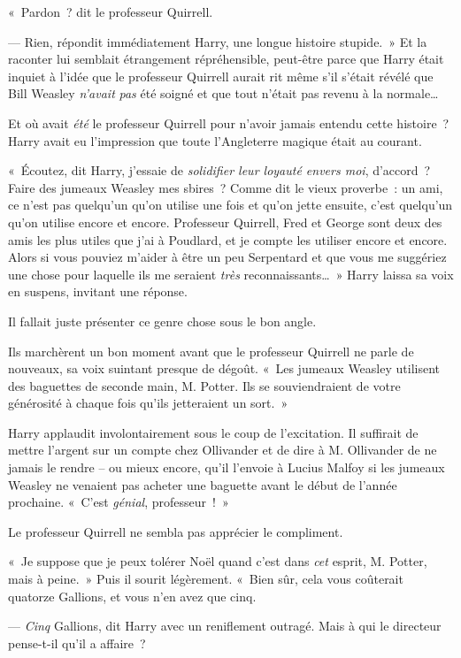 «~Pardon~? dit le professeur Quirrell.

--- Rien, répondit immédiatement Harry, une longue histoire stupide.~»
Et la raconter lui semblait étrangement répréhensible, peut-être parce que Harry était inquiet à l'idée que le professeur Quirrell aurait rit même s'il s'était révélé que Bill Weasley \emph{n'avait} \emph{pas} été soigné et que tout n'était pas revenu à la normale…

Et où avait \emph{été} le professeur Quirrell pour n'avoir jamais entendu cette histoire~?
Harry avait eu l'impression que toute l'Angleterre magique était au courant.

«~Écoutez, dit Harry, j'essaie de \emph{solidifier leur loyauté envers moi}, d'accord~?
Faire des jumeaux Weasley mes sbires~?
Comme dit le vieux proverbe~: un ami, ce n'est pas quelqu'un qu'on utilise une fois et qu'on jette ensuite, c'est quelqu'un qu'on utilise encore et encore.
Professeur Quirrell, Fred et George sont deux des amis les plus utiles que j'ai à Poudlard, et je compte les utiliser encore et encore.
Alors si vous pouviez m'aider à être un peu Serpentard et que vous me suggériez une chose pour laquelle ils me seraient \emph{très} reconnaissants…~»
Harry laissa sa voix en suspens, invitant une réponse.

Il fallait juste présenter ce genre chose sous le bon angle.

Ils marchèrent un bon moment avant que le professeur Quirrell ne parle de nouveaux, sa voix suintant presque de dégoût.
«~Les jumeaux Weasley utilisent des baguettes de seconde main, M. Potter.
Ils se souviendraient de votre générosité à chaque fois qu'ils jetteraient un sort.~»

Harry applaudit involontairement sous le coup de l'excitation.
Il suffirait de mettre l'argent sur un compte chez Ollivander et de dire à M. Ollivander de ne jamais le rendre -- ou mieux encore, qu'il l'envoie à Lucius Malfoy si les jumeaux Weasley ne venaient pas acheter une baguette avant le début de l'année prochaine.
«~C'est \emph{génial}, professeur~!~»

Le professeur Quirrell ne sembla pas apprécier le compliment.

«~Je suppose que je peux tolérer Noël quand c'est dans \emph{cet} esprit, M. Potter, mais à peine.~»
Puis il sourit légèrement.
«~Bien sûr, cela vous coûterait quatorze Gallions, et vous n'en avez que cinq.

--- \emph{Cinq} Gallions, dit Harry avec un reniflement outragé.
Mais à qui le directeur pense-t-il qu'il a affaire~?

